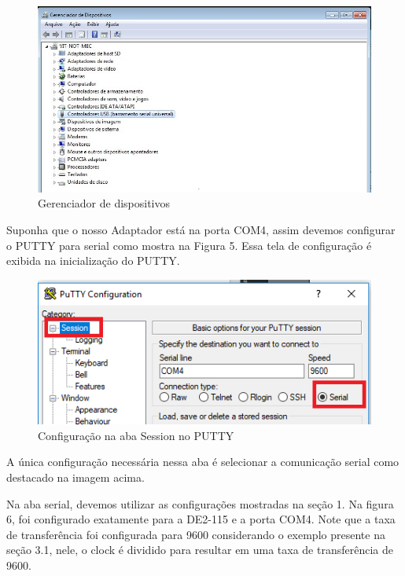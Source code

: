 \documentclass[12pt,a4paper]{article} %
\begin{document}
\begin{figure}[!htb]
\centering
	\includegraphics[scale=0.7]{imagens/289124.jpg}
	\caption{Gerenciador de dispositivos}
\end{figure}
Suponha que o nosso Adaptador está na porta COM4, assim devemos 
configurar o PUTTY para serial como mostra na Figura 5. Essa tela de 
configuração é exibida na inicialização do PUTTY.
\begin{figure}[!htb]
\centering
	\includegraphics[scale=0.6]{imagens/config1.png}
	\caption{Configuração na aba Session no PUTTY}
	\label{config1}
\end{figure}


\pagebreak
A única configuração necessária nessa aba é selecionar a comunicação 
serial como destacado na imagem acima.

Na aba serial, devemos utilizar as configurações mostradas na seção 1. 
Na figura 6, foi configurado exatamente para a DE2-115 e a porta COM4. 
Note que a taxa de transferência foi configurada para 9600 considerando 
o exemplo presente na seção 3.1, nele, o clock é dividido para resultar 
em uma taxa de transferência de 9600.
\end{document}
